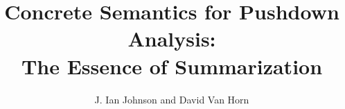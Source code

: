 \documentclass[article]{llncs}
\begin{document}
\title{Concrete Semantics for Pushdown Analysis:\\The Essence of Summarization}
\author{J. Ian Johnson and David Van Horn}


\maketitle

\begin{abstract}

\end{abstract}







\appendix{}
\end{document}
